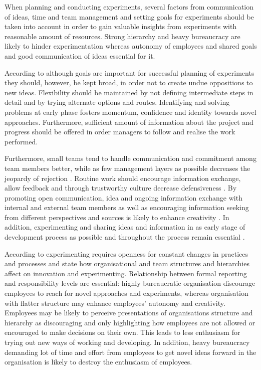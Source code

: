 When planning and conducting experiments, several factors from communication of ideas, time and team management and setting goals for experiments should be taken into account in order to gain valuable insights from experiments with reasonable amount of resources. Strong hierarchy and heavy bureaucracy are likely to hinder experimentation whereas autonomy of employees and shared goals and good communication of ideas essential for it. 

According to \citet{quinn1985managing} although goals are important for successful planning of experiments they should, however, be kept broad, in order not to create undue oppositions to new ideas. Flexibility should be maintained by not defining intermediate steps in detail and by trying alternate options and routes. Identifying and solving problems at early phase fosters momentum, confidence and identity towards novel approaches. Furthermore, sufficient amount of information about the project and progress should be offered in order managers to follow and realise the work performed. \citep{quinn1985managing}

Furthermore, small teams tend to handle communication and commitment among team members better, while as few management layers as possible decreases the jeopardy of rejection \citep{quinn1985managing}. Routine work should encourage information exchange, allow feedback and through trustworthy culture decrease defensiveness \citep{argyris1994good}. By promoting open communication, idea and ongoing information exchange with internal and external team members as well as encouraging information seeking from different perspectives and sources is likely to enhance creativity \citep{ancona1992demography,dougherty1996sustained}. In addition, experimenting and sharing ideas and information in as early stage of development process as possible and throughout the process remain essential \citep{thomke2001enlightened}. 
  
According to \citet{thomke2003r} experimenting requires openness for constant changes in practices and processes and \citet{shalley2004leaders} state how organisational and team structures and hierarchies affect on innovation and experimenting. Relationship between formal reporting and responsibility levels are essential: highly bureaucratic organisation discourage employees to reach for novel approaches and experiments, whereas organisation with flatter structure may enhance employees' autonomy and creativity. Employees may be likely to perceive presentations of organisations structure and hierarchy as discouraging and only highlighting how employees are not allowed or encouraged to make decisions on their own. This leads to less enthusiasm for trying out new ways of working and developing. In addition, heavy bureaucracy demanding lot of time and effort from employees to get novel ideas forward in the organisation is likely to destroy the enthusiasm of employees. \citep{shalley2004leaders}

